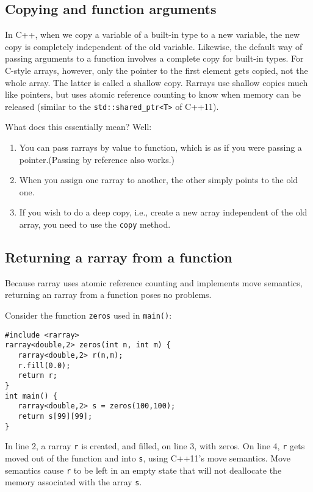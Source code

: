 \documentclass[11pt,twoside]{article}
\begin{document}
\subsection{Copying and function arguments}

In C++, when we copy a variable of a built-in type to a new variable,
the new copy is completely independent of the old variable. Likewise,
the default way of passing arguments to a function involves a complete
copy for built-in types.  For C-style arrays, however, only the
pointer to the first element gets copied, not the whole array. The
latter is called a shallow copy. Rarrays use shallow copies much like
pointers, but uses atomic reference counting to know when memory can be released (similar to the \texttt{std::shared\_ptr<T>} of C++11). 

What does this essentially mean? Well:
\begin{enumerate}
\item You can pass rarrays by value to function, which is as if you
  were passing a pointer.\linebreak (Passing by reference also works.)
\item When you assign one rarray to another, the other simply points to the old one.
\item If you wish to do a deep copy, i.e., create a new array independent of the old array, you need to use the \texttt{copy} method.
\end{enumerate}

\subsection{Returning a rarray from a function\label{returnvalues}}

Because rarray uses atomic reference counting and implements move semantics, returning an rarray from a
function poses no problems.

Consider the function \texttt{zeros} used in \texttt{main()}:
\vspace{-9pt}
\begin{framed}\vspace{-12pt}%
\begin{verbatim}
#include <rarray>
rarray<double,2> zeros(int n, int m) {
   rarray<double,2> r(n,m);
   r.fill(0.0);
   return r;
}
int main() {
   rarray<double,2> s = zeros(100,100);
   return s[99][99];
}
\end{verbatim}%
\vspace{-12pt}
\end{framed}\vspace{-8pt}
In line 2, a rarray \texttt{r} is created, and filled, on line 3, with
zeros. On line 4, \texttt{r} gets moved out of
the function and into \texttt{s}, using C++11's move
semantics. Move semantics cause \texttt{r} to be left in an empty state
that will not deallocate the memory associated with the array \texttt{s}.
\end{document}
